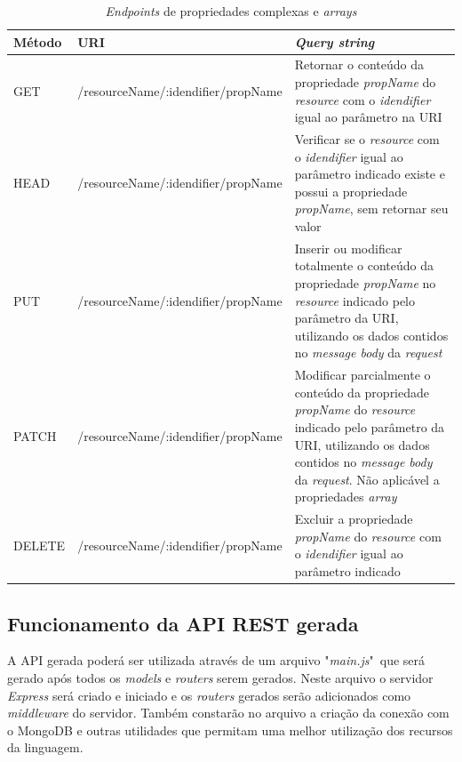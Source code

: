 \begin{table}[]
    \centering
    \begin{tabularx}{\textwidth}{|l|l|X|}
        \hline
        \textbf{Método} & \textbf{URI} & \textbf{\textit{Query string}} \\
        \hline

        GET & /resourceName/:idendifier/propName & Retornar o conteúdo da propriedade \textit{propName} do \textit{resource} com o \textit{idendifier} igual ao parâmetro na URI\\
        \hline

        HEAD & /resourceName/:idendifier/propName & Verificar se o \textit{resource} com o \textit{idendifier} igual ao parâmetro indicado existe e possui a propriedade \textit{propName}, sem retornar seu valor\\
        \hline

        PUT & /resourceName/:idendifier/propName & Inserir ou modificar totalmente o conteúdo da propriedade \textit{propName} no \textit{resource} indicado pelo parâmetro da URI, utilizando os dados contidos no \textit{message body} da \textit{request}\\
        \hline

        PATCH & /resourceName/:idendifier/propName & Modificar parcialmente o conteúdo da propriedade \textit{propName} do \textit{resource} indicado pelo parâmetro da URI, utilizando os dados contidos no \textit{message body} da \textit{request}. Não aplicável a propriedades \textit{array}\\
        \hline

        DELETE & /resourceName/:idendifier/propName & Excluir a propriedade \textit{propName} do \textit{resource} com o \textit{idendifier} igual ao parâmetro indicado\\
        \hline
        \hline
    \end{tabularx}
    \caption{\textit{Endpoints} de propriedades complexas e \textit{arrays}}
    \label{tab:end_prop}
\end{table}



\subsection{Funcionamento da API REST gerada}

A API gerada poderá ser utilizada através de um arquivo "\textit{main.js}"\ que será gerado após todos os \textit{models} e \textit{routers} serem gerados. Neste arquivo o servidor \textit{Express} será criado e iniciado e os \textit{routers} gerados serão adicionados como \textit{middleware} do servidor. Também constarão no arquivo a criação da conexão com o MongoDB e outras utilidades que permitam uma melhor utilização dos recursos da linguagem.

